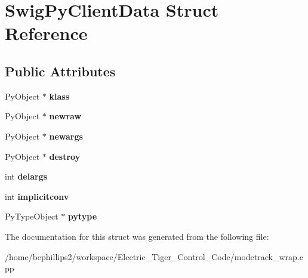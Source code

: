 \hypertarget{struct_swig_py_client_data}{\section{Swig\-Py\-Client\-Data Struct Reference}
\label{struct_swig_py_client_data}
}
\subsection*{Public Attributes}
\begin{DoxyCompactItemize}
\item 
\hypertarget{struct_swig_py_client_data_a482d64908147c310a56d1541476079dc}{Py\-Object $\ast$ {\bfseries klass}}\label{struct_swig_py_client_data_a482d64908147c310a56d1541476079dc}

\item 
\hypertarget{struct_swig_py_client_data_a4da9e7723a1319cb42cda4ad186f65a3}{Py\-Object $\ast$ {\bfseries newraw}}\label{struct_swig_py_client_data_a4da9e7723a1319cb42cda4ad186f65a3}

\item 
\hypertarget{struct_swig_py_client_data_a8f6dacca2c445f175d622fb9264e3715}{Py\-Object $\ast$ {\bfseries newargs}}\label{struct_swig_py_client_data_a8f6dacca2c445f175d622fb9264e3715}

\item 
\hypertarget{struct_swig_py_client_data_a1c4e62712f23db599e85e24e14818d59}{Py\-Object $\ast$ {\bfseries destroy}}\label{struct_swig_py_client_data_a1c4e62712f23db599e85e24e14818d59}

\item 
\hypertarget{struct_swig_py_client_data_a9cb4b9b02743d09dbe216f304e2b7df0}{int {\bfseries delargs}}\label{struct_swig_py_client_data_a9cb4b9b02743d09dbe216f304e2b7df0}

\item 
\hypertarget{struct_swig_py_client_data_a5f9ebdbc04a774559a64b926b6ec4070}{int {\bfseries implicitconv}}\label{struct_swig_py_client_data_a5f9ebdbc04a774559a64b926b6ec4070}

\item 
\hypertarget{struct_swig_py_client_data_a1f172e51bb27f670dacdf8247843b4c2}{Py\-Type\-Object $\ast$ {\bfseries pytype}}\label{struct_swig_py_client_data_a1f172e51bb27f670dacdf8247843b4c2}

\end{DoxyCompactItemize}


The documentation for this struct was generated from the following file\-:\begin{DoxyCompactItemize}
\item 
/home/bephillips2/workspace/\-Electric\-\_\-\-Tiger\-\_\-\-Control\-\_\-\-Code/modetrack\-\_\-wrap.\-cpp\end{DoxyCompactItemize}
